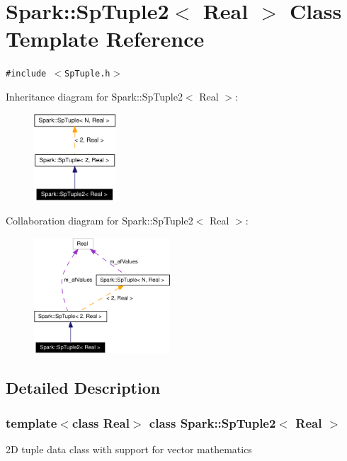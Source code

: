 \section{Spark::Sp\-Tuple2$<$ Real $>$ Class Template Reference}
\label{classSpark_1_1SpTuple2}
{\tt \#include $<$Sp\-Tuple.h$>$}

Inheritance diagram for Spark::Sp\-Tuple2$<$ Real $>$:\begin{figure}[H]
\begin{center}
\leavevmode
\includegraphics[width=86pt]{classSpark_1_1SpTuple2__inherit__graph}
\end{center}
\end{figure}
Collaboration diagram for Spark::Sp\-Tuple2$<$ Real $>$:\begin{figure}[H]
\begin{center}
\leavevmode
\includegraphics[width=144pt]{classSpark_1_1SpTuple2__coll__graph}
\end{center}
\end{figure}


\subsection{Detailed Description}
\subsubsection*{template$<$class Real$>$ class Spark::Sp\-Tuple2$<$ Real $>$}

2D tuple data class with support for vector mathematics 

